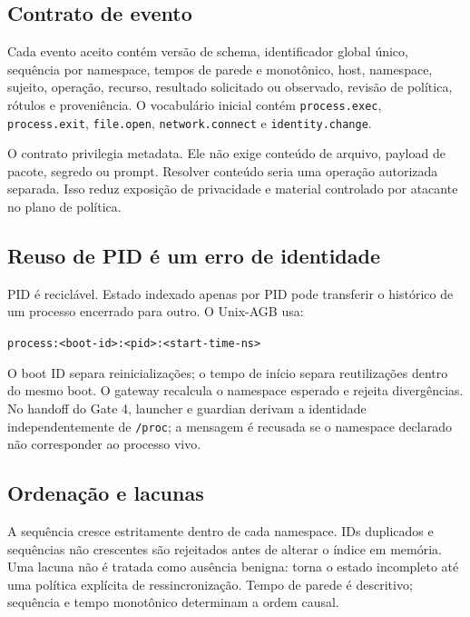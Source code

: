 \documentclass[11pt,a4paper]{article}
\begin{document}
\subsection{Contrato de evento}

Cada evento aceito contém versão de schema, identificador global único,
sequência por namespace, tempos de parede e monotônico, host, namespace,
sujeito, operação, recurso, resultado solicitado ou observado, revisão de
política, rótulos e proveniência. O vocabulário inicial contém
\texttt{process.exec}, \texttt{process.exit}, \texttt{file.open},
\texttt{network.connect} e \texttt{identity.change}.

O contrato privilegia metadata. Ele não exige conteúdo de arquivo, payload de
pacote, segredo ou prompt. Resolver conteúdo seria uma operação autorizada
separada. Isso reduz exposição de privacidade e material controlado por atacante
no plano de política.

\subsection{Reuso de PID é um erro de identidade}

PID é reciclável. Estado indexado apenas por PID pode transferir o histórico de
um processo encerrado para outro. O Unix-AGB usa:

\begin{center}
\texttt{process:<boot-id>:<pid>:<start-time-ns>}
\end{center}

O boot ID separa reinicializações; o tempo de início separa reutilizações dentro
do mesmo boot. O gateway recalcula o namespace esperado e rejeita divergências.
No handoff do Gate 4, launcher e guardian derivam a identidade
independentemente de \texttt{/proc}; a mensagem é recusada se o namespace
declarado não corresponder ao processo vivo.

\subsection{Ordenação e lacunas}

A sequência cresce estritamente dentro de cada namespace. IDs duplicados e
sequências não crescentes são rejeitados antes de alterar o índice em memória.
Uma lacuna não é tratada como ausência benigna: torna o estado incompleto até
uma política explícita de ressincronização. Tempo de parede é descritivo;
sequência e tempo monotônico determinam a ordem causal.
\end{document}
